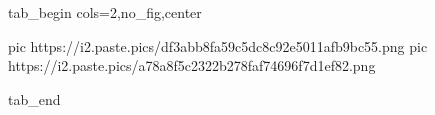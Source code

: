  
 
 
 
 

\ifcmt
  tab_begin cols=2,no_fig,center

     pic https://i2.paste.pics/df3abb8fa59c5dc8c92e5011afb9bc55.png
		 pic https://i2.paste.pics/a78a8f5c2322b278faf74696f7d1ef82.png

  tab_end
\fi
